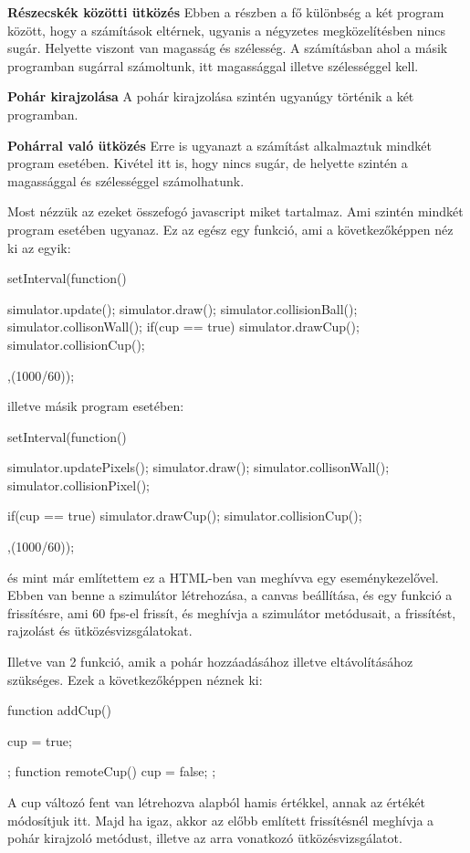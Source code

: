 \textbf{Részecskék közötti ütközés}
Ebben a részben a fő különbség a két program között, hogy a számítások eltérnek, ugyanis a négyzetes megközelítésben nincs sugár. Helyette viszont van magasság és szélesség. A számításban ahol a másik programban sugárral számoltunk, itt magassággal illetve szélességgel kell. 

\textbf{Pohár kirajzolása}
A pohár kirajzolása szintén ugyanúgy történik a két programban. 

\textbf{Pohárral való ütközés}
Erre is ugyanazt a számítást alkalmaztuk mindkét program esetében. Kivétel itt is, hogy nincs sugár, de helyette szintén a magassággal és szélességgel számolhatunk.




Most nézzük az ezeket összefogó javascript miket tartalmaz. Ami szintén mindkét program esetében ugyanaz. Ez az egész egy funkció, ami a következőképpen néz ki az egyik:
\begin{java}
	setInterval(function()
	{
		simulator.update();
		simulator.draw();
		simulator.collisionBall();
		simulator.collisonWall();
		if(cup == true)
		{
			simulator.drawCup();
			simulator.collisionCup();
		}
		
		
		
	},(1000/60));
	
\end{java}
illetve másik program esetében:
\begin{java}
	setInterval(function()
	{
		
		simulator.updatePixels();
		simulator.draw();
		simulator.collisonWall();
		simulator.collisionPixel();
		
		if(cup == true)
		{
			simulator.drawCup();
			simulator.collisionCup();
		}
		
		
		
	},(1000/60));
	
\end{java}
és mint már említettem ez a HTML-ben van meghívva egy eseménykezelővel. Ebben van benne a szimulátor létrehozása, a canvas beállítása, és egy funkció a frissítésre, ami 60 fps-el frissít, és meghívja a szimulátor metódusait, a frissítést, rajzolást és ütközésvizsgálatokat. 

Illetve van 2 funkció, amik a pohár hozzáadásához illetve eltávolításához szükséges. Ezek a következőképpen néznek ki:
\begin{java}
	function addCup(){
		cup = true;
		
	};
	function remoteCup(){
		cup = false;
	};
	
\end{java}
A cup változó fent van létrehozva alapból hamis értékkel, annak az értékét módosítjuk itt. Majd ha igaz, akkor az előbb említett frissítésnél meghívja a pohár kirajzoló metódust, illetve az arra vonatkozó ütközésvizsgálatot.


